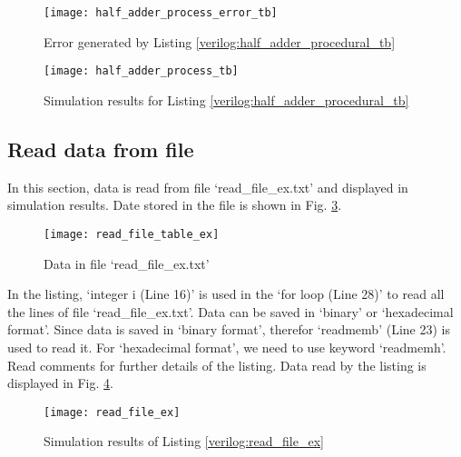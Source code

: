 
%

\begin{figure}[!h]
	\centering
	\texttt{[image: half\_adder\_process\_error\_tb]}
	\caption{Error generated by Listing \ref{verilog:half_adder_procedural_tb}}
	\label{fig:half_adder_process_error_tb}
\end{figure}

\begin{figure}[!h]
	\centering
	\texttt{[image: half\_adder\_process\_tb]}
	\caption{Simulation results for Listing \ref{verilog:half_adder_procedural_tb}}
	\label{fig:half_adder_process_tb}
\end{figure}



\subsection{Read data from file} \label{sec_read_data_from_file}
%
In this section, data is read from file `read\_file\_ex.txt' and displayed in simulation results. Date stored in the file is shown in Fig. \ref{fig:read_file_table_ex}. 

\begin{figure}[!h]
	\centering
	\texttt{[image: read\_file\_table\_ex]}
	\caption{Data in file  `read\_file\_ex.txt'}
	\label{fig:read_file_table_ex}
\end{figure}

\begin{explanation}
	In the listing, `integer i (Line 16)' is used in the `for loop (Line 28)' to read all the lines of file `read\_file\_ex.txt'. Data can be saved in `binary' or `hexadecimal format'. Since data is saved in `binary format', therefor `readmemb' (Line 23) is used to read it. For `hexadecimal format', we need to use keyword `readmemh'. Read comments for further details of the listing. Data read by the listing is displayed in Fig. \ref{fig:read_file_ex}.  
\end{explanation}



\begin{figure}[!h]
	\centering
	\texttt{[image: read\_file\_ex]}
	\caption{Simulation results of Listing \ref{verilog:read_file_ex} }
	\label{fig:read_file_ex}
\end{figure}
%
%

